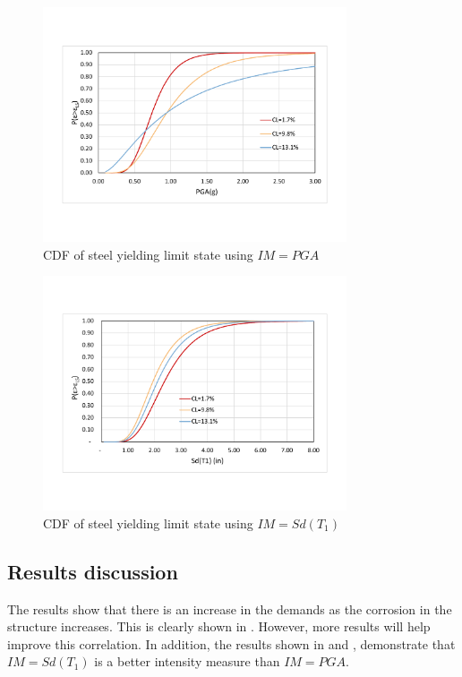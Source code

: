 \begin{figure}[htbp]
	\centering
	\includegraphics[width=0.8\textwidth]{Chapter-5/figs/CDF_PGA}
	\caption{CDF of steel yielding limit state using $IM=PGA$}
	\label{fig:CDF_SY_PGA}
\end{figure}
\begin{figure}[htbp]
	\centering
	\includegraphics[width=0.8\textwidth]{Chapter-5/figs/CDF_SdT1}
	\caption{CDF of steel yielding limit state using $IM=Sd(T_1)$}
	\label{fig:CDF_SY_SDT1}
\end{figure}
\newpage
\subsection{Results discussion}
The results show that there is an increase in the demands as the corrosion in the structure increases. This is clearly shown in . However, more results will help improve this correlation. In addition, the results shown in  and , demonstrate that $IM=Sd(T_1)$ is a better intensity measure than $IM=PGA$. 

